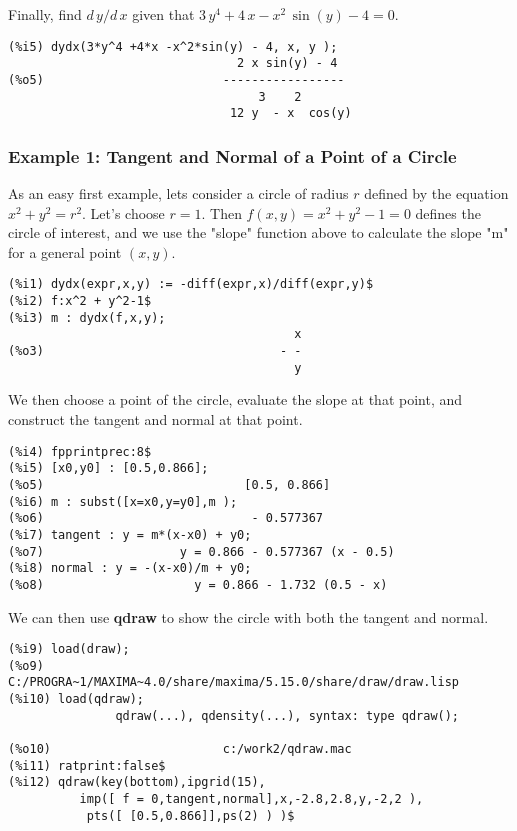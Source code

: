 \documentclass[12pt]{article}
\begin{document}
\smallskip
Finally, find $d\,y/d\,x$ given that $3\,y^4 + 4\,x -x^2\,\sin(y) - 4 = 0$.
\small
\begin{verbatim}
(%i5) dydx(3*y^4 +4*x -x^2*sin(y) - 4, x, y );
                                2 x sin(y) - 4
(%o5)                         -----------------
                                   3    2
                               12 y  - x  cos(y)
\end{verbatim}
\normalsize






\subsubsection{Example 1: Tangent and Normal of a Point of a Circle}
As an easy first example, lets consider a circle of radius $r$ defined
  by the equation $x^2 + y^2 = r^2$.
Let's choose $r = 1$.
Then $f(x,y) = x^2 + y^2 -1 = 0$ defines the circle of interest, and we use
  the "slope" function above to calculate the slope "m" for a general point $(x,y)$.
\small
\begin{verbatim}
(%i1) dydx(expr,x,y) := -diff(expr,x)/diff(expr,y)$
(%i2) f:x^2 + y^2-1$
(%i3) m : dydx(f,x,y);
                                        x
(%o3)                                 - -
                                        y
\end{verbatim}
\normalsize
We then choose a point of the circle, evaluate the slope at that point,
  and construct the tangent and normal at that point.
\small
\begin{verbatim}
(%i4) fpprintprec:8$
(%i5) [x0,y0] : [0.5,0.866];
(%o5)                            [0.5, 0.866]
(%i6) m : subst([x=x0,y=y0],m );
(%o6)                             - 0.577367
(%i7) tangent : y = m*(x-x0) + y0;
(%o7)                   y = 0.866 - 0.577367 (x - 0.5)
(%i8) normal : y = -(x-x0)/m + y0;
(%o8)                     y = 0.866 - 1.732 (0.5 - x)
\end{verbatim}
\normalsize
We can then use \textbf{qdraw} to show the circle with both the
  tangent and normal.
\small
\begin{verbatim}
(%i9) load(draw);
(%o9)   C:/PROGRA~1/MAXIMA~4.0/share/maxima/5.15.0/share/draw/draw.lisp
(%i10) load(qdraw);
               qdraw(...), qdensity(...), syntax: type qdraw(); 

(%o10)                        c:/work2/qdraw.mac
(%i11) ratprint:false$
(%i12) qdraw(key(bottom),ipgrid(15),
          imp([ f = 0,tangent,normal],x,-2.8,2.8,y,-2,2 ),
           pts([ [0.5,0.866]],ps(2) ) )$
\end{verbatim}
\normalsize
\end{document}
